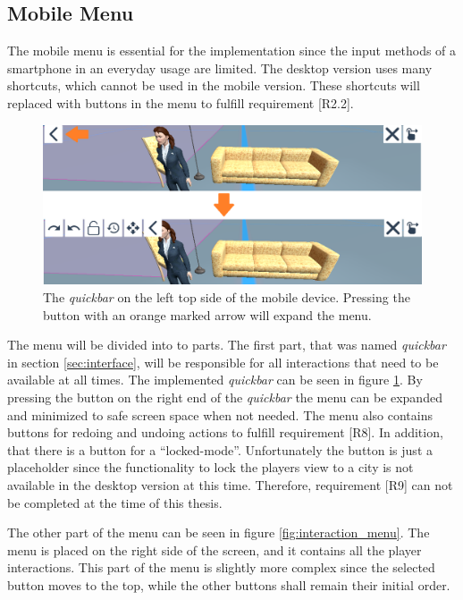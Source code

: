 \subsection{Mobile Menu}
\label{sec:menu}

The mobile menu is essential for the implementation since the input methods of a smartphone in an everyday usage are limited.
The desktop version uses many \glspl{shortcut}, which cannot be used in the mobile version.
These \glspl{shortcut} will replaced with buttons in the menu to fulfill requirement [R2.2].

\begin{figure}[htb]
    \centering
    \includegraphics[width=1\textwidth]{Implementation/img/quickmenu.png}
    \caption{The \textit{quickbar} on the left top side of the mobile device. Pressing the button with an orange marked arrow will expand the menu.}\label{fig:quickmenu}
\end{figure}

The menu will be divided into to parts.
The first part, that was named \textit{quickbar} in section \ref{sec:interface}, will be responsible for all interactions that need to be available at all times.
The implemented \textit{quickbar} can be seen in figure \ref{fig:quickmenu}.
By pressing the button on the right end of the \textit{quickbar} the menu can be expanded and minimized to safe screen space when not needed.
The menu also contains buttons for redoing and undoing actions to fulfill requirement [R8].
In addition, that there is a button for a \enquote{locked-mode}.
Unfortunately the button is just a placeholder since the functionality to lock the players view to a city is not available in the desktop version at this time.
Therefore, requirement [R9] can not be completed at the time of this thesis. 

The other part of the menu can be seen in figure \ref{fig:interaction_menu}.
The menu is placed on the right side of the screen, and it contains all the player interactions.
This part of the menu is slightly more complex since the selected button moves to the top, while the other buttons shall remain their initial order.

